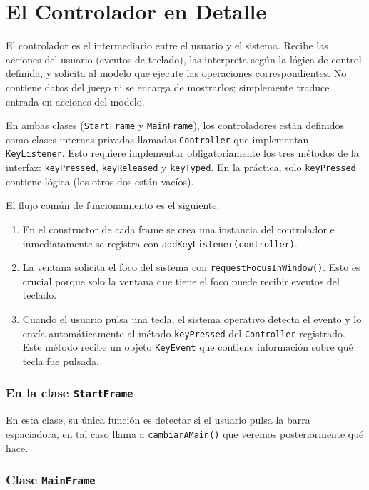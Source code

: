 \documentclass[12pt, a4paper]{article}
\begin{document}
\section{El Controlador en Detalle}

El controlador es el intermediario entre el usuario y el sistema. Recibe las acciones del usuario (eventos de teclado), las interpreta según la lógica de control definida, y solicita al modelo que ejecute las operaciones correspondientes. No contiene datos del juego ni se encarga de mostrarlos; simplemente traduce entrada en acciones del modelo.

En ambas clases (\texttt{StartFrame} y \texttt{MainFrame}), los controladores están definidos como clases internas privadas llamadas \texttt{Controller} que implementan \texttt{KeyListener}. Esto requiere implementar obligatoriamente los tres métodos de la interfaz: \texttt{keyPressed}, \texttt{keyReleased} y \texttt{keyTyped}. En la práctica, solo \texttt{keyPressed} contiene lógica (los otros dos están vacíos).

El flujo común de funcionamiento es el siguiente:

\begin{enumerate}[leftmargin=2em]
    \item En el constructor de cada frame se crea una instancia del controlador e inmediatamente se registra con \lstinline|addKeyListener(controller)|.
    \item La ventana solicita el foco del sistema con \lstinline|requestFocusInWindow()|. Esto es crucial porque solo la ventana que tiene el foco puede recibir eventos del teclado.
    \item Cuando el usuario pulsa una tecla, el sistema operativo detecta el evento y lo envía automáticamente al método \texttt{keyPressed} del \texttt{Controller} registrado. Este método recibe un objeto \texttt{KeyEvent} que contiene información sobre qué tecla fue pulsada.
\end{enumerate}

\subsubsection*{En la clase \texttt{StartFrame}}

En esta clase, su única función es detectar si el usuario pulsa la barra espaciadora, en tal caso llama a \lstinline|cambiarAMain()| que veremos posteriormente qué hace.

\subsubsection*{Clase \texttt{MainFrame}}
\end{document}
